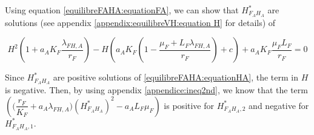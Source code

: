 \documentclass{article}
\newcommand{\lfa}{\lambda_{FH, A}}
\begin{document}
\begin{itemize}
Using equation \eqref{equilibreFAHA:equationFA}, we can show that $H^*_{F_AH_A}$ are solutions (see appendix \ref{appendix:equilibreVH:equation H} for details) of

\begin{equation}
H^2 \left(1 + a_AK_F \dfrac{\lfa}{r_F} \right) - H \left( a_AK_F\left(1 - \dfrac{\mu_F + L_F \lfa}{r_F} \right) + c \right) + a_A K_F\dfrac{\mu_F L_F}{r_F} = 0
\label{equilibreFAHA:equationHA2}
\end{equation}

Since $H^*_{F_AH_A}$ are positive solutions of \eqref{equilibreFAHA:equationHA}, the term in $H$ is negative. Then, by using appendix \ref{appendice:ineq2nd}, we know that the term $\left( \Big(\dfrac{r_F}{K_F} + a_A\lfa\Big) (H^*_{F_AH_A})^2 - a_A L_F \mu_F \right)$ is positive for $H^*_{F_AH_A, 2}$ and negative for $H^*_{F_AH_A, 1}$.
\\


\end{itemize}
\end{document}
